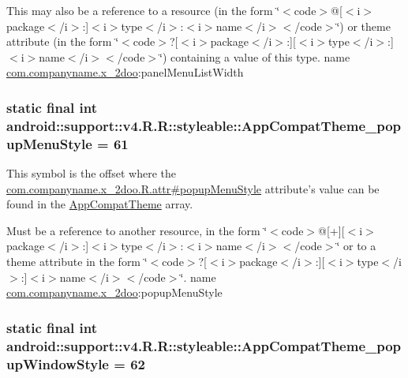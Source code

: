 This may also be a reference to a resource (in the form \char`\"{}$<$code$>$@\mbox{[}$<$i$>$package$<$/i$>$:\mbox{]}$<$i$>$type$<$/i$>$:$<$i$>$name$<$/i$>$$<$/code$>$\char`\"{}) or theme attribute (in the form \char`\"{}$<$code$>$?\mbox{[}$<$i$>$package$<$/i$>$:\mbox{]}\mbox{[}$<$i$>$type$<$/i$>$:\mbox{]}$<$i$>$name$<$/i$>$$<$/code$>$\char`\"{}) containing a value of this type.  name \hyperlink{namespacecom_1_1companyname_1_1x__2doo}{com.companyname.x\_\-2doo}:panelMenuListWidth \hypertarget{classandroid_1_1support_1_1v4_1_1_r_1_1styleable_833514c9937294d571844e13b7a70786}{
\subsubsection[{AppCompatTheme\_\-popupMenuStyle}]{\setlength{\rightskip}{0pt plus 5cm}static final int android::support::v4.R.R::styleable::AppCompatTheme\_\-popupMenuStyle = 61}}
\label{classandroid_1_1support_1_1v4_1_1_r_1_1styleable_833514c9937294d571844e13b7a70786}


This symbol is the offset where the \hyperlink{classcom_1_1companyname_1_1x__2doo_1_1_r_1_1attr_cc7a9c0c6f39487c3979a935eeaa6bc4}{com.companyname.x\_\-2doo.R.attr\#popupMenuStyle} attribute's value can be found in the \hyperlink{classandroid_1_1support_1_1v4_1_1_r_1_1styleable_0873e92ba21076bb5a4aeadeb7f5779f}{AppCompatTheme} array.

Must be a reference to another resource, in the form \char`\"{}$<$code$>$@\mbox{[}+\mbox{]}\mbox{[}$<$i$>$package$<$/i$>$:\mbox{]}$<$i$>$type$<$/i$>$:$<$i$>$name$<$/i$>$$<$/code$>$\char`\"{} or to a theme attribute in the form \char`\"{}$<$code$>$?\mbox{[}$<$i$>$package$<$/i$>$:\mbox{]}\mbox{[}$<$i$>$type$<$/i$>$:\mbox{]}$<$i$>$name$<$/i$>$$<$/code$>$\char`\"{}.  name \hyperlink{namespacecom_1_1companyname_1_1x__2doo}{com.companyname.x\_\-2doo}:popupMenuStyle \hypertarget{classandroid_1_1support_1_1v4_1_1_r_1_1styleable_7b4761ddad1866b99166d9027b1a91de}{
\subsubsection[{AppCompatTheme\_\-popupWindowStyle}]{\setlength{\rightskip}{0pt plus 5cm}static final int android::support::v4.R.R::styleable::AppCompatTheme\_\-popupWindowStyle = 62}}
\label{classandroid_1_1support_1_1v4_1_1_r_1_1styleable_7b4761ddad1866b99166d9027b1a91de}


